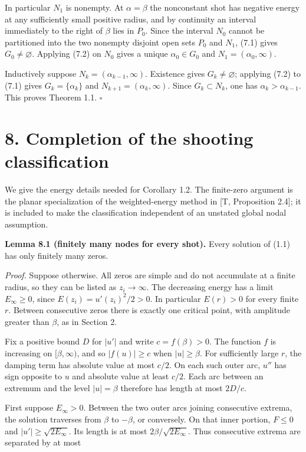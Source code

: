 \documentclass[11pt]{article}
\begin{document}
In particular \(N_1\) is nonempty. At \(\alpha=\beta\) the nonconstant
shot has negative energy at any sufficiently small positive radius, and
by continuity an interval immediately to the right of \(\beta\) lies in
\(P_0\). Since the interval \(N_0\) cannot be partitioned into the two
nonempty disjoint open sets \(P_0\) and \(N_1\), (7.1) gives
\(G_0\ne\varnothing\). Applying (7.2) on \(N_0\) gives a unique
\(\alpha_0\in G_0\) and \(N_1=(\alpha_0,\infty)\).

Inductively suppose \(N_k=(\alpha_{k-1},\infty)\). Existence gives
\(G_k\ne\varnothing\); applying (7.2) to (7.1) gives
\(G_k=\{\alpha_k\}\) and \(N_{k+1}=(\alpha_k,\infty)\). Since
\(G_k\subset N_k\), one has \(\alpha_k>\alpha_{k-1}\). This proves
Theorem 1.1. \(\square\)

\section{8. Completion of the shooting
classification}\label{completion-of-the-shooting-classification}

We give the energy details needed for Corollary 1.2. The finite-zero
argument is the planar specialization of the weighted-energy method in
{[}T, Proposition 2.4{]}; it is included to make the classification
independent of an unstated global nodal assumption.

\textbf{Lemma 8.1 (finitely many nodes for every shot).} Every solution
of (1.1) has only finitely many zeros.

\emph{Proof.} Suppose otherwise. All zeros are simple and do not
accumulate at a finite radius, so they can be listed as
\(z_i\to\infty\). The decreasing energy has a limit \(E_\infty\geq0\),
since \(E(z_i)=u'(z_i)^2/2>0\). In particular \(E(r)>0\) for every
finite \(r\). Between consecutive zeros there is exactly one critical
point, with amplitude greater than \(\beta\), as in Section 2.

Fix a positive bound \(D\) for \(|u'|\) and write \(c=f(\beta)>0\). The
function \(f\) is increasing on \([\beta,\infty)\), and so
\(|f(u)|\geq c\) when \(|u|\geq\beta\). For sufficiently large \(r\),
the damping term has absolute value at most \(c/2\). On each such outer
arc, \(u''\) has sign opposite to \(u\) and absolute value at least
\(c/2\). Each arc between an extremum and the level \(|u|=\beta\)
therefore has length at most \(2D/c\).

First suppose \(E_\infty>0\). Between the two outer arcs joining
consecutive extrema, the solution traverses from \(\beta\) to
\(-\beta\), or conversely. On that inner portion, \(F\leq0\) and
\(|u'|\geq\sqrt{2E_\infty}\). Its length is at most
\(2\beta/\sqrt{2E_\infty}\). Thus consecutive extrema are separated by
at most
\end{document}
